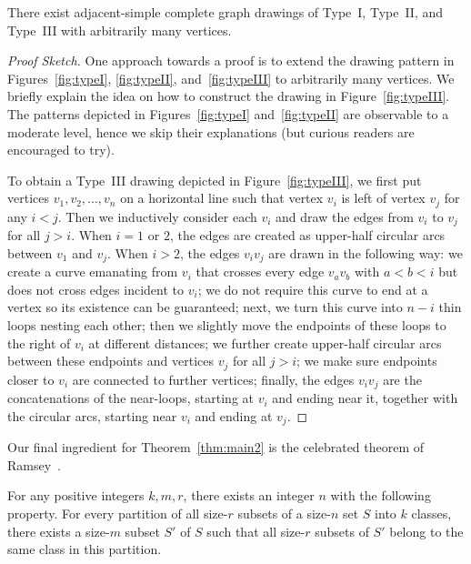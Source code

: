 \documentclass[a4paper,UKenglish,cleveref, autoref, thm-restate]{lipics_arxiv}
\begin{document}
\begin{proposition}\label{prop:type}
    There exist adjacent-simple complete graph drawings of Type~I, Type~II, and Type~III with arbitrarily many vertices.
\end{proposition}
\begin{proof}[Proof Sketch]
    One approach towards a proof is to extend the drawing pattern in Figures~\ref{fig:typeI}, \ref{fig:typeII}, and~\ref{fig:typeIII} to arbitrarily many vertices. We briefly explain the idea on how to construct the drawing in Figure~\ref{fig:typeIII}. The patterns depicted in Figures~\ref{fig:typeI} and~\ref{fig:typeII} are observable to a moderate level, hence we skip their explanations (but curious readers are encouraged to try).

    To obtain a Type~III drawing depicted in Figure~\ref{fig:typeIII}, we first put vertices $v_1,v_2,\dots,v_n$ on a horizontal line such that vertex $v_i$ is left of vertex $v_j$ for any $i<j$. Then we inductively consider each $v_i$ and draw the edges from $v_i$ to $v_j$ for all $j > i$. When $i=1$ or $2$, the edges are created as upper-half circular arcs between $v_1$ and $v_j$. When $i > 2$, the edges $v_iv_j$ are drawn in the following way: we create a curve emanating from $v_i$ that crosses every edge $v_av_b$ with $a<b<i$ but does not cross edges incident to $v_i$; we do not require this curve to end at a vertex so its existence can be guaranteed; next, we turn this curve into $n-i$ thin loops nesting each other; then we slightly move the endpoints of these loops to the right of $v_i$ at different distances; we further create upper-half circular arcs between these endpoints and vertices $v_j$ for all $j > i$; we make sure endpoints closer to $v_i$ are connected to further vertices; finally, the edges $v_iv_j$ are the concatenations of the near-loops, starting at $v_i$ and ending near it, together with the circular arcs, starting near $v_i$ and ending at $v_j$.
\end{proof}

Our final ingredient for Theorem~\ref{thm:main2} is the celebrated theorem of Ramsey~\cite{ramsey1930problem}.
\begin{theorem}\label{thm:ramsey}
    For any positive integers $k, m, r$, there exists an integer $n$ with the following property. For every partition of all size-$r$ subsets of a size-$n$ set $S$ into $k$ classes, there exists a size-$m$ subset $S'$ of $S$ such that all size-$r$ subsets of $S'$ belong to the same class in this partition.
\end{theorem}
\end{document}
